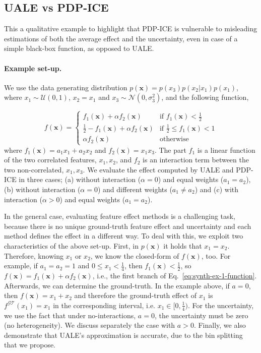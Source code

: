 \documentclass[twoside]{article}
\newcommand{\xb}{\mathbf{x}}
\begin{document}
\subsection{UALE vs PDP-ICE}
\label{sec:simulation-examples-1}

This a qualitative example to highlight that PDP-ICE is vulnerable to
misleading estimations of both the average effect and the uncertainty,
even in case of a simple black-box function, as opposed to UALE.

\paragraph{Example set-up.}
We use the data generating distribution
\(p(\mathbf{x}) = p(x_3)p(x_2|x_1)p(x_1)\), where
\(x_1 \sim \mathcal{U}(0,1)\), \(x_2 = x_1\) and
\(x_3 \sim \mathcal{N}(0, \sigma_3^2)\), and the following function,

\begin{equation}
  \label{eq:synth-ex-1-function}
  f(\mathbf{x}) = \begin{cases}
                    f_1(\mathbf{x}) + \alpha f_2(\mathbf{x}) & \text{if $f_1(\mathbf{x}) < \frac{1}{2}$ }\\
                    \frac{1}{2} - f_1(\mathbf{x}) + \alpha f_2(\mathbf{x}) & \text{if $\frac{1}{2} \leq f_1(\mathbf{x}) < 1$}\\
                    \alpha f_2(\mathbf{x}) &\text{otherwise}
                  \end{cases}
\end{equation}
%
where \(f_1(\mathbf{x}) = a_1 x_1 + a_2 x_2\) and
\(f_2(\mathbf{x}) = x_1x_3\). The part \(f_1\) is a linear function of
the two correlated features, \(x_1, x_2\), and \(f_2\) is an
interaction term between the two non-correlated, \(x_1, x_3\).  We
evaluate the effect computed by UALE and PDP-ICE in three cases; (a)
without interaction (\(\alpha=0\)) and equal weights (\(a_1=a_2\)),
(b) without interaction (\(\alpha=0\)) and different weights
(\( a_1 \neq a_2 \)) and (c) with interaction (\(\alpha > 0\)) and
equal weights (\(a_1=a_2\)).

In the general case, evaluating feature effect methods is a
challenging task, because there is no unique ground-truth feature
effect and uncertainty and each method defines the effect in a
different way. To deal with this, we exploit two characteristics of
the above set-up. First, in \(p(\xb)\) it holds that
\(x_1=x_2\). Therefore, knowing \(x_1\) or \(x_2\), we know the
closed-form of \(f(\xb)\), too. For example, if \(a_1=a_2=1\) and
\( 0 \leq x_1 < \frac{1}{4}\), then \(f_1(\xb) < \frac{1}{2}\), so
\(f(\xb) = f_1(\xb) + \alpha f_2(\xb) \), i.e., the first branch of
Eq.~\ref{eq:synth-ex-1-function}. Afterwards, we can determine the
ground-truth. In the example above, if \(a=0\), then
\(f(\xb) = x_1 + x_2\) and therefore the ground-truth effect of
\(x_1\) is \(f^{\mathcal{GT}}(x_1) = x_1\) in the corresponding
interval, i.e. \(x_1 \in [0, \frac{1}{4})\). For the uncertainty, we
use the fact that under no-interactions, \(a=0\), the uncertainty must
be zero (no heterogeneity). We discuss separately the case with
\(a>0\). Finally, we also demonstrate that UALE's approximation is
accurate, due to the bin splitting that we propose.
\end{document}
